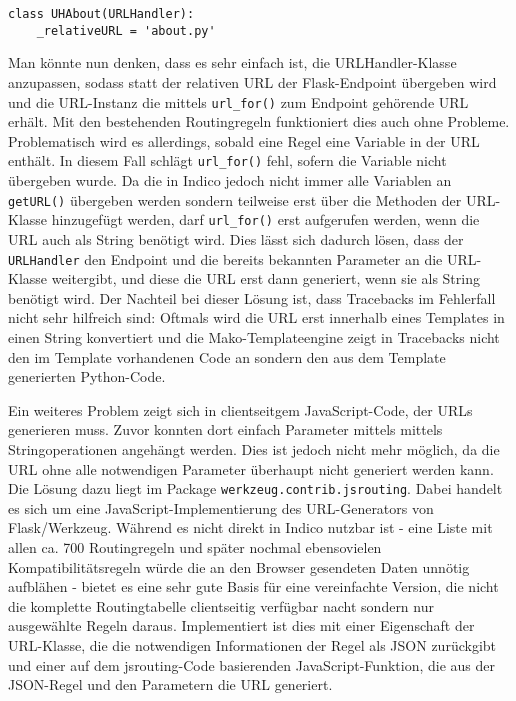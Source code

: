 \begin{lstlisting}[caption=URLHandler für about.py]
class UHAbout(URLHandler):
    _relativeURL = 'about.py'
\end{lstlisting}

Man könnte nun denken, dass es sehr einfach ist, die URLHandler-Klasse anzupassen, sodass statt der
relativen URL der Flask-Endpoint übergeben wird und die URL-Instanz die mittels
\lstinline{url_for()} zum Endpoint gehörende URL erhält. Mit den bestehenden Routingregeln
funktioniert dies auch ohne Probleme. Problematisch wird es allerdings, sobald eine Regel eine
Variable in der URL enthält. In diesem Fall schlägt \lstinline{url_for()} fehl, sofern die Variable
nicht übergeben wurde. Da die in Indico jedoch nicht immer alle Variablen an \lstinline{getURL()}
übergeben werden sondern teilweise erst über die Methoden der URL-Klasse hinzugefügt werden, darf
\lstinline{url_for()} erst aufgerufen werden, wenn die URL auch als String benötigt wird. Dies lässt
sich dadurch lösen, dass der \lstinline{URLHandler} den Endpoint und die bereits bekannten Parameter
an die URL-Klasse weitergibt, und diese die URL erst dann generiert, wenn sie als String benötigt
wird. Der Nachteil bei dieser Lösung ist, dass Tracebacks im Fehlerfall nicht sehr hilfreich sind:
Oftmals wird die URL erst innerhalb eines Templates in einen String konvertiert und die
Mako-Templateengine zeigt in Tracebacks nicht den im Template vorhandenen Code an sondern den aus
dem Template generierten Python-Code.

Ein weiteres Problem zeigt sich in clientseitgem JavaScript-Code, der URLs generieren muss. Zuvor
konnten dort einfach Parameter mittels mittels Stringoperationen angehängt werden. Dies ist jedoch
nicht mehr möglich, da die URL ohne alle notwendigen Parameter überhaupt nicht generiert werden
kann. Die Lösung dazu liegt im Package \lstinline{werkzeug.contrib.jsrouting}. Dabei handelt es sich
um eine JavaScript-Implementierung des URL-Generators von Flask/Werkzeug. Während es nicht direkt in
Indico nutzbar ist - eine Liste mit allen ca. 700 Routingregeln und später nochmal ebensovielen
Kompatibilitätsregeln würde die an den Browser gesendeten Daten unnötig aufblähen - bietet es eine
sehr gute Basis für eine vereinfachte Version, die nicht die komplette Routingtabelle clientseitig
verfügbar nacht sondern nur ausgewählte Regeln daraus. Implementiert ist dies mit einer Eigenschaft
der URL-Klasse, die die notwendigen Informationen der Regel als JSON zurückgibt und einer auf dem
jsrouting-Code basierenden JavaScript-Funktion, die aus der JSON-Regel und den Parametern die URL
generiert.

